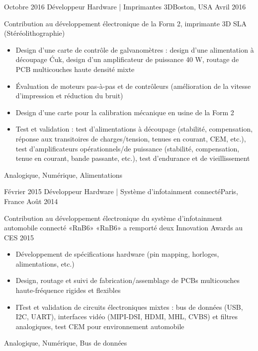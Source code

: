 \begin{experiences}
  \experience
    {Octobre 2016}   {Développeur Hardware | Imprimantes 3D}{}{Boston, USA}
    {Avril 2016} {
                      Contribution au développement électronique de la Form 2, imprimante 3D SLA (Stéréolithographie)
                      \begin{itemize}
                        \item Design d’une carte de contrôle de galvanomètres : design d’une alimentation à découpage Ćuk, design d’un amplificateur de puissance 40 W, routage de PCB multicouches haute densité mixte
                        \item Évaluation de moteurs pas-à-pas et de contrôleurs (amélioration de la vitesse d’impression et réduction du bruit)
                        \item Design d’une carte pour la calibration mécanique en usine de la Form 2
                        \item Test et validation : test d’alimentations à découpage (stabilité, compensation, réponse aux transitoires de charges/tension, tenues en courant, CEM, etc.), test d’amplificateurs opérationnels/de puissance (stabilité, compensation, tenue en courant, bande passante, etc.), test d’endurance et de vieillissement
                      \end{itemize}
                    }
                    {Analogique, Numérique, Alimentations}
                    
  \emptySeparator
  
  \experience
    {Février 2015} {Développeur Hardware | Système d'infotainment connecté}{}{Paris, France}
    {Août 2014}    {
                      Contribution au développement électronique du système d’infotainment automobile connecté «RnB6»
                      «RnB6» a remporté deux Innovation Awards au CES 2015
                      \begin{itemize}
                        \item Développement de spécifications hardware (pin mapping, horloges, alimentations, etc.)
                        \item Design, routage et suivi de fabrication/assemblage de PCBs multicouches haute-fréquence rigides et flexibles                        
                        \item ITest et validation de circuits électroniques mixtes : bus de données (USB, I2C, UART), interfaces vidéo (MIPI-DSI, HDMI, MHL, CVBS) et filtres analogiques, test CEM pour environnement automobile
                      \end{itemize}
                    }
                    {Analogique, Numérique, Bus de données}
\end{experiences}
